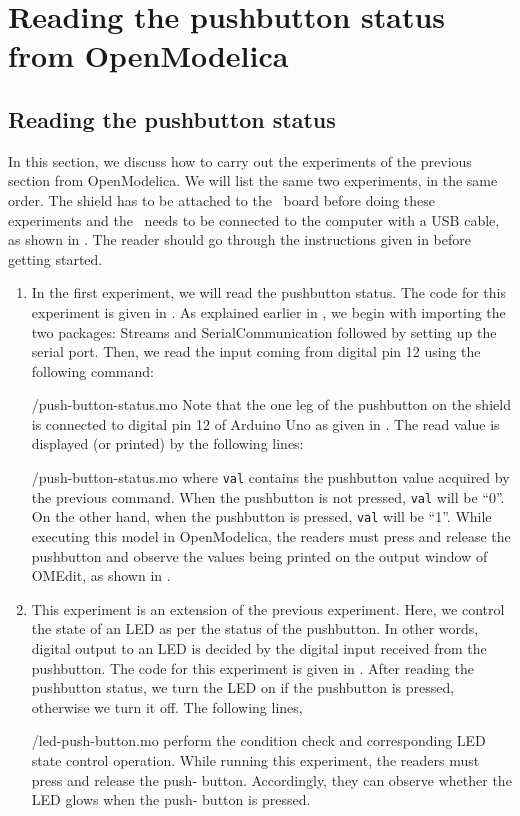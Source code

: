 \section{Reading the pushbutton status from OpenModelica}
\subsection{Reading the pushbutton status}
In this section, we discuss how to carry out the experiments of the
previous section from OpenModelica.  We will list the same two experiments,
in the same order.  The shield has to be attached to the \arduino\ board
before doing these experiments and the \arduino\ needs to be connected to the computer 
with a USB cable, as shown in .
The reader should go through the instructions given in
 before getting started.

\begin{enumerate}
\item In the first experiment, we will read the pushbutton status. The code for this experiment is given in
  . As explained earlier in , 
  we begin with importing the two packages: Streams and SerialCommunication followed 
  by setting up the serial port. Then, we read the input coming
 from digital pin 12 using the following command: 
 
  {\LocPushOpenModelicacode/push-button-status.mo}
  Note that the one leg of the pushbutton on the shield is connected to digital
pin 12 of Arduino Uno as given in . The read value is displayed (or
printed) by the following lines:

  {\LocPushOpenModelicacode/push-button-status.mo} where {\tt val} contains the pushbutton value acquired by the previous command.
  When the pushbutton is not pressed, {\tt val} will be ``0''. On the other hand,
  when the pushbutton is pressed, {\tt val} will be ``1''. While executing this model in OpenModelica, 
the readers must press and release the pushbutton and observe the values being printed
on the output window of OMEdit, as shown in .
\item This experiment is an extension of the previous
  experiment. Here, we control the state of an LED as per the status
  of the pushbutton. In other words, digital output to an LED is
  decided by the digital input received from the pushbutton. The code
  for this experiment is given in . 
  After reading the pushbutton status, we turn the LED on if the pushbutton is
  pressed, otherwise we turn it off. The following lines, 
  
  {\LocPushOpenModelicacode/led-push-button.mo} perform the condition check
  and corresponding LED state control operation. While running this experiment, the readers must press and release the push-
  button. Accordingly, they can observe whether the LED glows when the push-
  button is pressed.
\end{enumerate}

